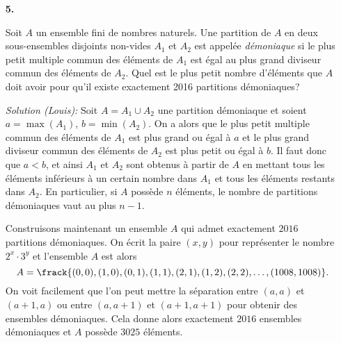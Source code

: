 \documentclass[language=german,style=solution]{smo}
\begin{document}
\begin{enumerate}
\newpage


\item[\textbf{5.}] %

Soit $A$ un ensemble fini de nombres naturels. Une partition de $A$ en deux sous-ensembles disjoints non-vides $A_1$ et $A_2$ est appelée \emph{démoniaque} si le plus petit multiple commun des éléments de $A_1$ est égal au plus grand diviseur commun des éléments de $A_2$. Quel est le plus petit nombre d'éléments que $A$ doit avoir pour qu'il existe exactement 2016 partitions démoniaques?

\textit{Solution (Louis): }
Soit $A = A_1 \cup A_2$ une partition démoniaque et soient $a = \max{(A_1)}$, $b = \min{(A_2)}$. On a alors que le plus petit multiple commun des éléments de $A_1$ est plus grand ou égal à $a$ et le plus grand diviseur commun des éléments de $A_2$ est plus petit ou égal à $b$. Il faut donc que $a < b$, et ainsi $A_1$ et $A_2$ sont obtenus à partir de $A$ en mettant tous les éléments inférieurs à un certain nombre dans $A_1$ et tous les éléments restants dans $A_2$. En particulier, si $A$ possède $n$ éléments, le nombre de partitions démoniaques vaut au plus $n-1$.

 Construisons maintenant un ensemble $A$ qui admet exactement $2016$ partitions démoniaques. On écrit la paire $(x, y)$ pour représenter le nombre $2^x\cdot 3^y$ et l'ensemble $A$ est alors
\[
 	A = \frack{(0,0), (1,0), (0,1), (1,1), (2,1), (1,2), (2,2), \ldots, (1008, 1008)}.
\]
On voit facilement que l'on peut mettre la séparation entre $(a, a)$ et $(a+1, a)$ ou entre $(a,a+1)$ et $(a+1, a+1)$ pour obtenir des ensembles démoniaques. Cela donne alors exactement $2016$ ensembles démoniaques et $A$ possède $3025$ éléments.


\end{enumerate}
\end{document}
